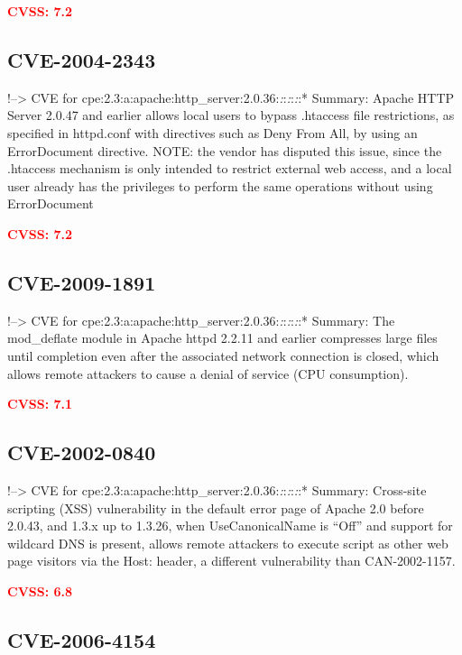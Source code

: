 \documentclass[a4paper, 12pt]{article}
\begin{document}
\textbf{\textcolor{red}{CVSS: 7.2}}

\hypertarget{cve-2004-2343}{%
\subsection{CVE-2004-2343}\label{cve-2004-2343}}

!--\textgreater{} CVE for
cpe:2.3:a:apache:http\_server:2.0.36:\emph{:}:\emph{:}:\emph{:}:*
Summary: Apache HTTP Server 2.0.47 and earlier allows local users to
bypass .htaccess file restrictions, as specified in httpd.conf with
directives such as Deny From All, by using an ErrorDocument directive.
NOTE: the vendor has disputed this issue, since the .htaccess mechanism
is only intended to restrict external web access, and a local user
already has the privileges to perform the same operations without using
ErrorDocument

\textbf{\textcolor{red}{CVSS: 7.2}}

\hypertarget{cve-2009-1891}{%
\subsection{CVE-2009-1891}\label{cve-2009-1891}}

!--\textgreater{} CVE for
cpe:2.3:a:apache:http\_server:2.0.36:\emph{:}:\emph{:}:\emph{:}:*
Summary: The mod\_deflate module in Apache httpd 2.2.11 and earlier
compresses large files until completion even after the associated
network connection is closed, which allows remote attackers to cause a
denial of service (CPU consumption).

\textbf{\textcolor{red}{CVSS: 7.1}}

\hypertarget{cve-2002-0840}{%
\subsection{CVE-2002-0840}\label{cve-2002-0840}}

!--\textgreater{} CVE for
cpe:2.3:a:apache:http\_server:2.0.36:\emph{:}:\emph{:}:\emph{:}:*
Summary: Cross-site scripting (XSS) vulnerability in the default error
page of Apache 2.0 before 2.0.43, and 1.3.x up to 1.3.26, when
UseCanonicalName is ``Off'' and support for wildcard DNS is present,
allows remote attackers to execute script as other web page visitors via
the Host: header, a different vulnerability than CAN-2002-1157.

\textbf{\textcolor{red}{CVSS: 6.8}}

\hypertarget{cve-2006-4154}{%
\subsection{CVE-2006-4154}\label{cve-2006-4154}}
\end{document}
